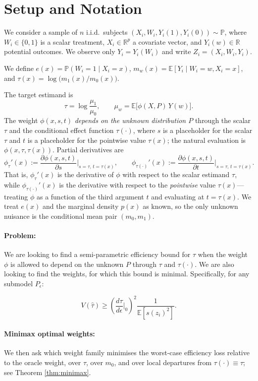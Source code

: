 \documentclass{article}
\begin{document}
\section*{Setup and Notation}

We consider a sample of $n$ i.i.d.\ subjects $(X_i, W_i, Y_i(1), Y_i(0)) \sim \mathbb{P}$, where $W_i \in \{0,1\}$ is a scalar treatment, $X_i \in \mathbb{R}^p$ a covariate vector, and $Y_i(w) \in \mathbb{R}$ potential outcomes.  We observe only $Y_i = Y_i(W_i)$ and write $Z_i = (X_i, W_i, Y_i)$.

We define $e(x) = \mathbb{P}(W_i=1\mid X_i=x)$, $m_w(x) = \mathbb{E}[Y_i\mid W_i=w, X_i=x]$, and $\tau(x) = \log\bigl(m_1(x)/m_0(x)\bigr)$.

The target estimand is
\[
  \tau = \log\frac{\mu_1}{\mu_0},
  \qquad
  \mu_w = \mathbb{E}\bigl[\phi(X, P)\,Y(w)\bigr].
\]
The weight $\phi(x, s, t)$ \emph{depends on the unknown distribution $P$} through the scalar $\tau$ and the
conditional effect function $\tau(\cdot)$, where $s$ is a placeholder for the scalar $\tau$ and $t$ is a placeholder for the pointwise value $\tau(x)$; the natural evaluation is $\phi(x,\tau,\tau(x))$.  Partial
derivatives are
\[
  \phi_\tau'(x) := \frac{\partial \phi(x,s,t)}{\partial s}\bigg|_{s=\tau,\,t=\tau(x)}, \qquad
  \phi_{\tau(\cdot)}'(x) := \frac{\partial \phi(x, s, t)}{\partial t}\bigg|_{s=\tau,\,t=\tau(x)}.
\]
That is, $\phi_\tau'(x)$ is the derivative of $\phi$ with respect to the scalar estimand $\tau$, while
$\phi_{\tau(\cdot)}'(x)$ is the derivative with respect to the \emph{pointwise} value $\tau(x)$---treating $\phi$ as a function of the third argument $t$ and evaluating at $t=\tau(x)$.
We treat $e(x)$ and the marginal density $p(x)$ as known, so the only unknown nuisance is the conditional
mean pair $(m_0, m_1)$.


\paragraph{Problem:} We are looking to find a semi-parametric efficiency bound for $\tau$ when the weight $\phi$ is allowed to depend on the unknown $P$ through $\tau$ and $\tau(\cdot)$. We are also looking to find the weights, for which this bound is minimal. Specifically, for any submodel $P_\epsilon$:

\[V(\hat \tau) \geq \left(\frac{d\tau}{d\epsilon}\bigg|_0\right)^2\frac{1}{\mathbb{E}[s(z_i)^2]}.\]

\paragraph{Minimax optimal weights:} We then ask which weight family minimises the worst-case efficiency loss relative to the oracle weight, over $\tau$, over $m_0$, and over local departures from $\tau(\cdot)\equiv\tau$; see Theorem \ref{thm:minimax}.
\end{document}
